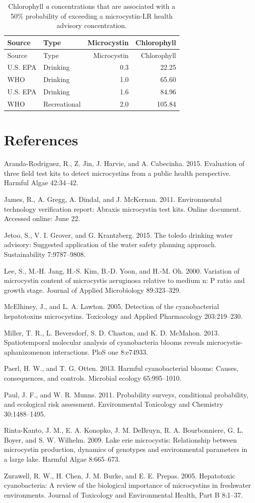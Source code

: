 \documentclass[11pt,]{article}
\begin{document}
\newpage

\begin{longtable}[c]{@{}llrr@{}}
\caption{Chlorophyll \textit{a} concentrations that are associated with
a 50\% probability of exceeding a microcystin-LR health advisory
concentration. \label{tab:mc_chla_table}}\tabularnewline
\toprule
Source & Type & Microcystin & Chlorophyll\tabularnewline
\midrule
\endfirsthead
\toprule
Source & Type & Microcystin & Chlorophyll\tabularnewline
\midrule
\endhead
U.S. EPA & Drinking & 0.3 & 22.25\tabularnewline
WHO & Drinking & 1.0 & 65.60\tabularnewline
U.S. EPA & Drinking & 1.6 & 84.96\tabularnewline
WHO & Recreational & 2.0 & 105.84\tabularnewline
\bottomrule
\end{longtable}

\newpage

\section*{References}\label{references}

Aranda-Rodriguez, R., Z. Jin, J. Harvie, and A. Cabecinha. 2015.
Evaluation of three field test kits to detect microcystins from a public
health perspective. Harmful Algae 42:34--42.

James, R., A. Gregg, A. Dindal, and J. McKernan. 2011. Environmental
technology verification report: Abraxis microcystin test kits. Online
document. Accessed online: June 22.

Jetoo, S., V. I. Grover, and G. Krantzberg. 2015. The toledo drinking
water advisory: Suggested application of the water safety planning
approach. Sustainability 7:9787--9808.

Lee, S., M.-H. Jang, H.-S. Kim, B.-D. Yoon, and H.-M. Oh. 2000.
Variation of microcystin content of microcystis aeruginosa relative to
medium n: P ratio and growth stage. Journal of Applied Microbiology
89:323--329.

McElhiney, J., and L. A. Lawton. 2005. Detection of the cyanobacterial
hepatotoxins microcystins. Toxicology and Applied Pharmacology
203:219--230.

Miller, T. R., L. Beversdorf, S. D. Chaston, and K. D. McMahon. 2013.
Spatiotemporal molecular analysis of cyanobacteria blooms reveals
microcystis-aphanizomenon interactions. PloS one 8:e74933.

Paerl, H. W., and T. G. Otten. 2013. Harmful cyanobacterial blooms:
Causes, consequences, and controls. Microbial ecology 65:995--1010.

Paul, J. F., and W. R. Munns. 2011. Probability surveys, conditional
probability, and ecological risk assessment. Environmental Toxicology
and Chemistry 30:1488--1495.

Rinta-Kanto, J. M., E. A. Konopko, J. M. DeBruyn, R. A. Bourbonniere, G.
L. Boyer, and S. W. Wilhelm. 2009. Lake erie microcystis: Relationship
between microcystin production, dynamics of genotypes and environmental
parameters in a large lake. Harmful Algae 8:665--673.

Zurawell, R. W., H. Chen, J. M. Burke, and E. E. Prepas. 2005.
Hepatotoxic cyanobacteria: A review of the biological importance of
microcystins in freshwater environments. Journal of Toxicology and
Environmental Health, Part B 8:1--37.
\end{document}
